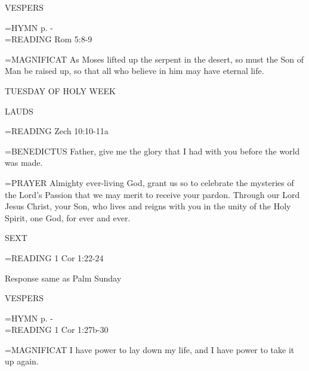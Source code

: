 \begin{flushleft}\normalsize VESPERS\\\end{flushleft}
\hangindent=\parindent \small{\uppercase{HYMN} p. \pageref{lent:firstHymn}-\pageref{lent:lastHymn}\\}
\hangindent=\parindent \small{\uppercase{READING}}    Rom 5:8-9 \textbf{   \\}

\hangindent=\parindent \small{MAGNIFICAT 	As Moses lifted up the serpent in the desert, so must the Son of Man be raised up, so that all who believe in him may have eternal life.\\}

TUESDAY OF HOLY WEEK

\begin{flushleft}\normalsize LAUDS\\\end{flushleft}
\hangindent=\parindent \small{\uppercase{READING}}    Zech 10:10-11a \textbf{   \\}

\hangindent=\parindent \small{BENEDICTUS 	Father, give me the glory that I had with you before the world was made.\\}

\hangindent=\parindent \small{PRAYER 	Almighty ever-living God, grant us so to celebrate the mysteries of the Lord's Passion that we may merit to receive your pardon. Through our Lord Jesus Christ, your Son, who lives and reigns with you in the unity of the Holy Spirit, one God, for ever and ever.}

\begin{flushleft}\normalsize SEXT\\\end{flushleft}
\hangindent=\parindent \small{\uppercase{READING}}    1 Cor 1:22-24 \textbf{   \\}

Response same as Palm Sunday

\begin{flushleft}\normalsize VESPERS\\\end{flushleft}
\hangindent=\parindent \small{\uppercase{HYMN} p. \pageref{lent:firstHymn}-\pageref{lent:lastHymn}\\}
\hangindent=\parindent \small{\uppercase{READING}}    1 Cor 1:27b-30 \textbf{   \\}

\hangindent=\parindent \small{MAGNIFICAT 	I have power to lay down my life, and I have power to take it up again.\\}

